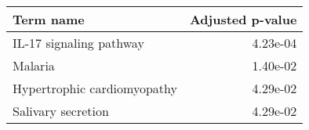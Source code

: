 \begin{tabular}{lr}
\toprule
                  Term name &  Adjusted p-value \\
\midrule
    IL-17 signaling pathway &          4.23e-04 \\
                    Malaria &          1.40e-02 \\
Hypertrophic cardiomyopathy &          4.29e-02 \\
         Salivary secretion &          4.29e-02 \\
\bottomrule
\end{tabular}
